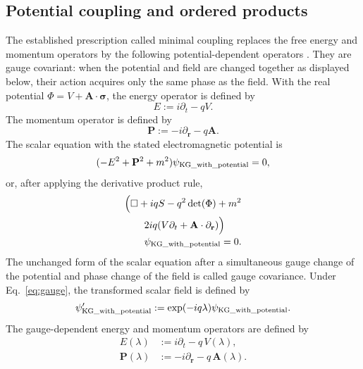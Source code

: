 \documentclass[10pt,letterpaper]{article}
\let\STAamsmathtext\text
\newcommand{\eqtext}[1]{\STAamsmathtext{\normalfont\rmfamily #1}}
\newcommand{\eqfunc}[1]{\operatorname{#1}}
\renewcommand{\text}[1]{\STAamsmathtext{\normalfont\rmfamily #1}}
\newcommand{\pv}[1]{#1}
\newcommand{\vct}[1]{\mathbf{#1}}
\newcommand{\sigv}{\vct{\pv{\bm{\sigma}}}}
\newcommand{\delop}{\partial}
\newcommand{\delr}{\delop_{\vct{r}}}
\newcommand{\gradv}{\delr}
\newcommand{\detf}[1]{\eqfunc{det}\!\left(#1\right)}
\begin{document}
\subsection{Potential coupling and ordered products}
The established prescription called minimal coupling replaces the free
energy and momentum operators by the following potential-dependent
operators \cite{jackson1998,greiner2000}. They are gauge covariant: when the
potential and field are changed together as displayed below, their action
acquires only the same phase as the field. With the real potential
\(\pv{\Phi}=V+\vct{A}\cdot\sigv\), the energy operator is defined by
\begin{equation}
E:=i\partial_t-qV.
\label{eq:energy-operator}
\end{equation}
The momentum operator is defined by
\begin{equation}
\vct{P}:=-i\gradv-q\vct{A}.
\label{eq:momentum-operator}
\end{equation}
The scalar equation with the stated electromagnetic potential is
\begin{equation}
(-E^2+\vct{P}^2+m^2)\psi_{\eqtext{KG\_with\_potential}}=0,
\label{eq:kg-coupled}
\end{equation}
or, after applying the derivative product rule,
\begin{equation}
\begin{aligned}
&\Bigl(\Box+iqS-q^2\detf{\pv{\Phi}}+m^2\\
&\qquad
2iq(V\partial_t+\vct{A}\cdot\gradv)\Bigr)\\[-0.2em]
&\qquad\psi_{\eqtext{KG\_with\_potential}}=0.
\end{aligned}
\label{eq:kg-expanded}
\end{equation}
The unchanged form of the scalar equation after a simultaneous gauge change
of the potential and phase change of the field is called gauge covariance.
Under Eq.\ \eqref{eq:gauge}, the transformed scalar field is defined by
\begin{equation}
\psi_{\eqtext{KG\_with\_potential}}'
:=\exp(-iq\lambda)\psi_{\eqtext{KG\_with\_potential}}.
\label{eq:scalar-gauge-field}
\end{equation}
The gauge-dependent energy and momentum operators are defined by
\begin{align}
E(\lambda)&:=i\partial_t-q\,V(\lambda),
\label{eq:gauge-energy-operator}\\
\vct{P}(\lambda)&:=-i\gradv-q\,\vct{A}(\lambda).
\label{eq:gauge-momentum-operator}
\end{align}
\end{document}
